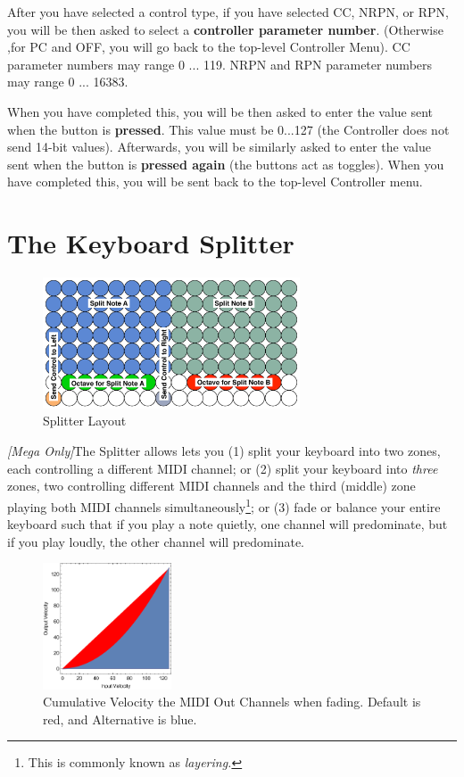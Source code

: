 \documentclass{article}
\begin{document}
\begin{description}
	After you have selected a control type, if you have selected CC, NRPN, or RPN, you will be then asked to select a {\bf controller parameter number}.  (Otherwise ,for PC and OFF, you will go back to the top-level Controller Menu).  CC parameter numbers may range 0 ... 119.  NRPN and RPN parameter numbers may range 0 ... 16383.
	
	When you have completed this, you will be then asked to enter the value sent when the button is {\bf pressed}.  This value must be 0...127 (the Controller does not send 14-bit values).  Afterwards, you will be similarly asked to enter the value sent when the button is {\bf pressed again} (the buttons act as toggles).  When you have completed this, you will be sent back to the top-level Controller menu.
	\end{description}

\section {The Keyboard Splitter}
\label{splitter}

\begin{figure}
\vspace{-2em}\includegraphics[width=3in]{split}
\vspace{-2em}\caption{\small Splitter Layout}
\label{splitter}
\end{figure}

\textit{[Mega Only]}\qquad The Splitter allows lets you (1) split your keyboard into two zones, each controlling a different MIDI channel; or (2) split your keyboard into {\it three} zones, two controlling different MIDI channels and the third (middle) zone playing both MIDI channels simultaneously\footnote{This is commonly known as {\it layering.}}; or (3) fade or balance your entire keyboard such that if you play a note quietly, one channel will predominate, but if you play loudly, the other channel will predominate.

\begin{figure}
\includegraphics[width=1.5in]{Fade}
\vspace{-2em}\caption{\small Cumulative Velocity the MIDI Out Channels when fading.  Default is {\color{red}red}, and Alternative is {\color{blue} blue}.}
\vspace{-2em}
\label{splitter}
\end{figure}
\end{document}
